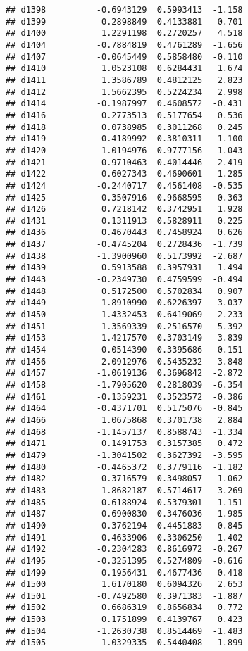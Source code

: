 \documentclass[
]{article}
\begin{document}
\begin{verbatim}
## d1398          -0.6943129  0.5993413  -1.158
## d1399           0.2898849  0.4133881   0.701
## d1400           1.2291198  0.2720257   4.518
## d1404          -0.7884819  0.4761289  -1.656
## d1407          -0.0645449  0.5858480  -0.110
## d1410           1.0523108  0.6284431   1.674
## d1411           1.3586789  0.4812125   2.823
## d1412           1.5662395  0.5224234   2.998
## d1414          -0.1987997  0.4608572  -0.431
## d1416           0.2773513  0.5177654   0.536
## d1418           0.0738985  0.3011268   0.245
## d1419          -0.4189992  0.3810311  -1.100
## d1420          -1.0194976  0.9777156  -1.043
## d1421          -0.9710463  0.4014446  -2.419
## d1422           0.6027343  0.4690601   1.285
## d1424          -0.2440717  0.4561408  -0.535
## d1425          -0.3507916  0.9668595  -0.363
## d1426           0.7218142  0.3742951   1.928
## d1431           0.1311913  0.5828911   0.225
## d1436           0.4670443  0.7458924   0.626
## d1437          -0.4745204  0.2728436  -1.739
## d1438          -1.3900960  0.5173992  -2.687
## d1439           0.5913588  0.3957931   1.494
## d1443          -0.2349730  0.4759599  -0.494
## d1448           0.5172500  0.5702834   0.907
## d1449           1.8910990  0.6226397   3.037
## d1450           1.4332453  0.6419069   2.233
## d1451          -1.3569339  0.2516570  -5.392
## d1453           1.4217570  0.3703149   3.839
## d1454           0.0514390  0.3395686   0.151
## d1456           2.0912976  0.5435232   3.848
## d1457          -1.0619136  0.3696842  -2.872
## d1458          -1.7905620  0.2818039  -6.354
## d1461          -0.1359231  0.3523572  -0.386
## d1464          -0.4371701  0.5175076  -0.845
## d1466           1.0675868  0.3701738   2.884
## d1468          -1.1457137  0.8588743  -1.334
## d1471           0.1491753  0.3157385   0.472
## d1479          -1.3041502  0.3627392  -3.595
## d1480          -0.4465372  0.3779116  -1.182
## d1482          -0.3716579  0.3498057  -1.062
## d1483           1.8682187  0.5714617   3.269
## d1485           0.6188924  0.5379301   1.151
## d1487           0.6900830  0.3476036   1.985
## d1490          -0.3762194  0.4451883  -0.845
## d1491          -0.4633906  0.3306250  -1.402
## d1492          -0.2304283  0.8616972  -0.267
## d1495          -0.3251395  0.5274809  -0.616
## d1499           0.1956431  0.4677436   0.418
## d1500           1.6170180  0.6094326   2.653
## d1501          -0.7492580  0.3971383  -1.887
## d1502           0.6686319  0.8656834   0.772
## d1503           0.1751899  0.4139767   0.423
## d1504          -1.2630738  0.8514469  -1.483
## d1505          -1.0329335  0.5440408  -1.899

\end{verbatim}
\end{document}
